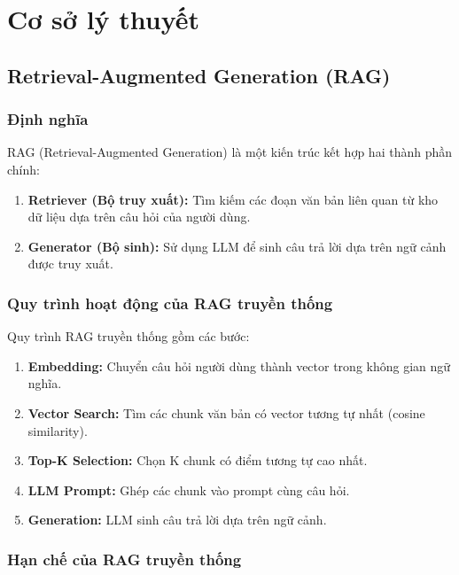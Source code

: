 \documentclass[12pt,a4paper]{article}
\begin{document}
\section{Cơ sở lý thuyết}

\subsection{Retrieval-Augmented Generation (RAG)}

\subsubsection{Định nghĩa}

RAG (Retrieval-Augmented Generation) là một kiến trúc kết hợp hai thành phần chính:

\begin{enumerate}
  \item \textbf{Retriever (Bộ truy xuất):} Tìm kiếm các đoạn văn bản liên quan từ kho dữ liệu dựa trên câu hỏi của người dùng.
  \item \textbf{Generator (Bộ sinh):} Sử dụng LLM để sinh câu trả lời dựa trên ngữ cảnh được truy xuất.
\end{enumerate}

\subsubsection{Quy trình hoạt động của RAG truyền thống}

Quy trình RAG truyền thống gồm các bước:

\begin{enumerate}
  \item \textbf{Embedding:} Chuyển câu hỏi người dùng thành vector trong không gian ngữ nghĩa.
  \item \textbf{Vector Search:} Tìm các chunk văn bản có vector tương tự nhất (cosine similarity).
  \item \textbf{Top-K Selection:} Chọn K chunk có điểm tương tự cao nhất.
  \item \textbf{LLM Prompt:} Ghép các chunk vào prompt cùng câu hỏi.
  \item \textbf{Generation:} LLM sinh câu trả lời dựa trên ngữ cảnh.
\end{enumerate}

\subsubsection{Hạn chế của RAG truyền thống}
\end{document}
